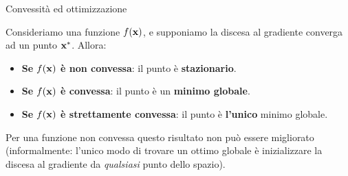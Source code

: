 \documentclass[12pt,aspectratio=169]{beamer}
\begin{document}
\begin{frame}{Convessità ed ottimizzazione}
	
	\begin{tcolorbox}
	Consideriamo una funzione $f(\boldsymbol{\mathbf{x}})$, e supponiamo la discesa al gradiente converga ad un punto $\boldsymbol{\mathbf{x}}^*$. Allora:
	\begin{itemize}
		\item \textbf{Se $f(\boldsymbol{\mathbf{x}})$ è non convessa}: il punto è \textbf{stazionario}.
		\item \textbf{Se $f(\boldsymbol{\mathbf{x}})$ è convessa}: il punto è un \textbf{minimo globale}.
		\item \textbf{Se $f(\boldsymbol{\mathbf{x}})$ è strettamente convessa}: il punto è \textbf{l'unico} minimo globale.
	\end{itemize}
	\end{tcolorbox}
	Per una funzione non convessa questo risultato non può essere migliorato (informalmente: l'unico modo di trovare un ottimo globale è inizializzare la discesa al gradiente da \textit{qualsiasi} punto dello spazio).
	
\end{frame}
\end{document}

